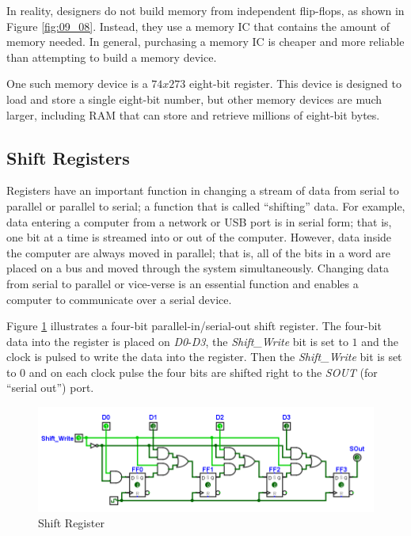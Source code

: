 In reality, designers do not build memory from independent flip-flops, as shown in Figure \ref{fig:09_08}. Instead, they use a memory \ac{IC} that contains the amount of memory needed. In general, purchasing a memory \ac{IC} is cheaper and more reliable than attempting to build a memory device.

One such memory device is a $ 74x273 $ eight-bit register. This device is designed to load and store a single eight-bit number, but other memory devices are much larger, including \ac{RAM} that can store and retrieve millions of eight-bit bytes.

\subsection{Shift Registers}
\label{SL:subsec:shift_registers}

Registers have an important function in changing a stream of data from serial to parallel or parallel to serial; a function that is called ``shifting'' data. For example, data entering a computer from a network or \ac{USB} port is in serial form; that is, one bit at a time is streamed into or out of the computer. However, data inside the computer are always moved in parallel; that is, all of the bits in a word are placed on a bus and moved through the system simultaneously. Changing data from serial to parallel or vice-verse is an essential function and enables a computer to communicate over a serial device.

Figure \ref{fig:09_09} illustrates a four-bit parallel-in/serial-out shift register. The four-bit data into the register is placed on \emph{D0}-\emph{D3}, the \emph{Shift\_Write} bit is set to $ 1 $ and the clock is pulsed to write the data into the register. Then the \emph{Shift\_Write} bit is set to $ 0 $ and on each clock pulse the four bits are shifted right to the \emph{SOUT} (for ``serial out'') port.

\begin{figure}[H]
	\centering
	\includegraphics[width=\maxwidth{.95\linewidth}]{gfx/09_09}
	\caption{Shift Register}
	\label{fig:09_09}
\end{figure}


